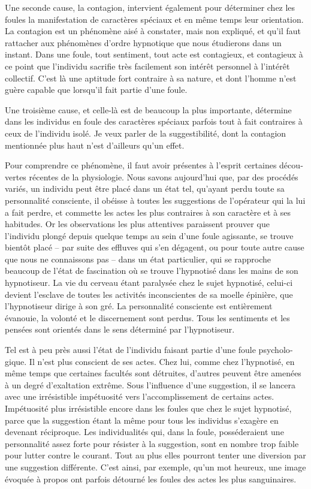 \documentclass[french,twoside]{book} %
\begin{document}
Une seconde cause, la contagion, intervient égale­ment pour déterminer chez les foules la manifestation de caractères spéciaux et en même temps leur orientation. La contagion est un phénomène aisé à constater, mais non expliqué, et qu’il faut rattacher aux phénomènes d’ordre hypnotique que nous étudierons dans un instant. Dans une foule, tout sentiment, tout acte est contagieux, et contagieux à ce point que l’individu sacrifie très facilement son intérêt personnel à l’intérêt collectif. C’est là une aptitude fort contraire à sa nature, et dont l’homme n’est guère capable que lorsqu’il fait partie d’une foule.\par
Une troisième cause, et celle-là est de beaucoup la plus importante, détermine dans les individus en foule des caractères spéciaux parfois tout à fait contraires à ceux de l’individu isolé. Je veux parler de la suggestibilité, dont la contagion mentionnée plus haut n’est d’ailleurs qu’un effet.\par
Pour comprendre ce phénomène, il faut avoir présentes à l’esprit certaines décou­vertes récentes de la physiologie. Nous savons aujourd’hui que, par des procédés variés, un individu peut être placé dans un état tel, qu’ayant perdu toute sa person­nalité consciente, il obéisse à toutes les suggestions de l’opérateur qui la lui a fait perdre, et commette les actes les plus contraires à son caractère et à ses habitudes. Or les observations les plus attentives paraissent prouver que l’individu plongé depuis quelque temps au sein d’une foule agissante, se trouve bientôt placé – par suite des effluves qui s’en dégagent, ou pour toute autre cause que nous ne connaissons pas – dans un état particulier, qui se rapproche beaucoup de l’état de fascination où se trouve l’hypnotisé dans les mains de son hypnotiseur. La vie du cerveau étant para­lysée chez le sujet hypnotisé, celui-ci devient l’esclave de toutes les activités inco­nscientes de sa moelle épinière, que l’hypnotiseur dirige à son gré. La personnalité consciente est entièrement évanouie, la volonté et le discernement sont perdus. Tous les sentiments et les pensées sont orientés dans le sens déterminé par l’hypnotiseur.\par
Tel est à peu près aussi l’état de l’individu faisant partie d’une foule psycholo­gique. Il n’est plus conscient de ses actes. Chez lui, comme chez l’hypnotisé, en même temps que certaines facultés sont détruites, d’autres peuvent être amenées à un degré d’exaltation extrême. Sous l’influence d’une suggestion, il se lancera avec une irrésis­tible impétuosité vers l’accomplissement de certains actes. Impétuosité plus irrésisti­ble encore dans les foules que chez le sujet hypnotisé, parce que la suggestion étant la même pour tous les individus s’exagère en devenant réciproque. Les individualités qui, dans la foule, posséderaient une personnalité assez forte pour résister à la suggestion, sont en nombre trop faible pour lutter contre le courant. Tout au plus elles pourront tenter une diversion par une suggestion différente. C’est ainsi, par exemple, qu’un mot heureux, une image évoquée à propos ont parfois détourné les foules des actes les plus sanguinaires.\par
\end{document}
